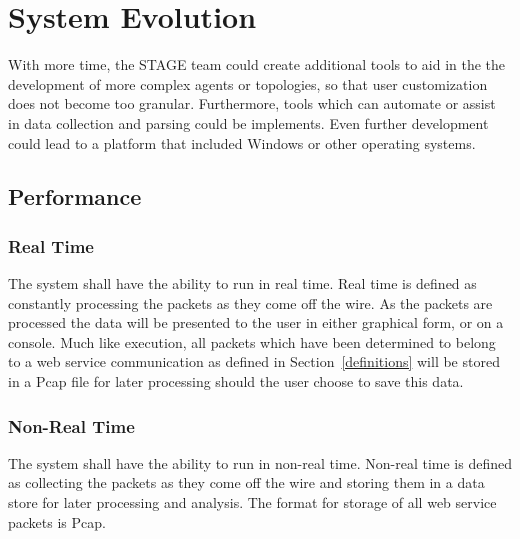 \documentclass[titlepage]{article}
\begin{document}
\section{System Evolution}

With more time, the STAGE team could create additional tools to aid in the the development of more complex agents or topologies, so that user customization does not become too granular.  Furthermore, tools which can automate or assist in data collection and parsing could be implements.  Even further development could lead to a platform that included Windows or other operating systems.


\subsection{Performance%
    \label{performance}%
}


\subsubsection{Real Time}\label{realtime} 
The system shall have the ability to run in real time. Real time is defined as
constantly processing the packets as they come off the wire. As the packets are
processed the data will be presented to the user in either graphical form, or
on a console.  Much like  execution, all packets which
have been determined to belong to a web service communication as defined in
Section~\ref{definitions} will be stored in a Pcap file for later processing
should the user choose to save this data.


\subsubsection{Non-Real Time}\label{nonrealtime}
The system shall have the ability to run in non-real time. Non-real time is
defined as collecting the packets as they come off the wire and storing them in
a data store for later processing and analysis.  The format for storage of all  
web service packets is Pcap.
\end{document}
